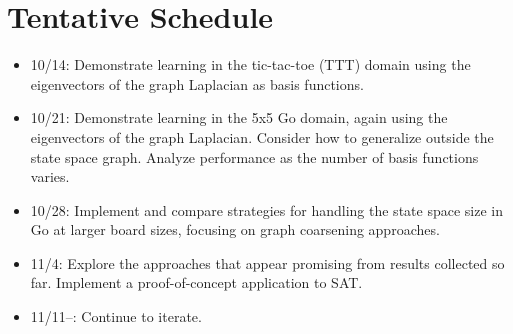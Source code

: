 \documentclass{article}
\begin{document}
\section*{Tentative Schedule}

\begin{itemize}
\item 10/14: Demonstrate learning in the tic-tac-toe (TTT) domain using the
eigenvectors of the graph Laplacian as basis functions.
\item 10/21: Demonstrate learning in the 5x5 Go domain, again using the
eigenvectors of the graph Laplacian. Consider how to generalize outside the
state space graph. Analyze performance as the number of basis functions varies.
\item 10/28: Implement and compare strategies for handling the state space size
in Go at larger board sizes, focusing on graph coarsening approaches.
\item 11/4: Explore the approaches that appear promising from results collected
so far. Implement a proof-of-concept application to SAT.
\item 11/11--: Continue to iterate.
\end{itemize}

%
%



\end{document}
